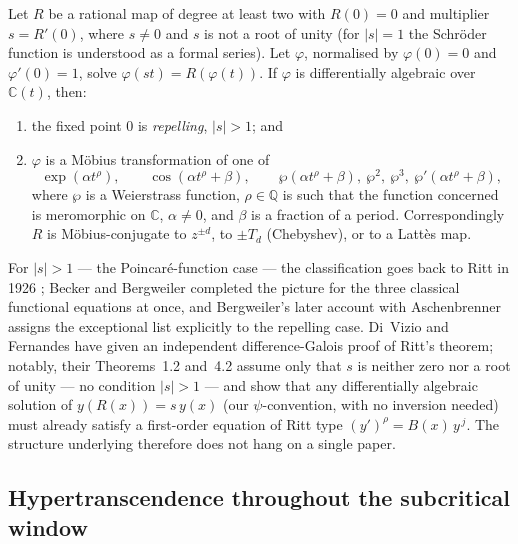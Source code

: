 \begin{theorem}
\label{a:thm:BB-main}
Let $R$ be a rational map of degree at least two with $R(0)=0$ and multiplier $s=R'(0)$, where $s\neq0$ and $s$ is not a root of unity (for $|s|=1$ the Schr\"oder function is understood as a formal series). Let $\varphi$, normalised by $\varphi(0)=0$ and $\varphi'(0)=1$, solve $\varphi(st)=R(\varphi(t))$. If $\varphi$ is differentially algebraic over $\mathbb{C}(t)$, then:
\begin{enumerate}[label=\textup{(\roman*)}]
\item the fixed point $0$ is \emph{repelling}, $|s|>1$; and
\item $\varphi$ is a M\"obius transformation of one of
\[
\exp(\alpha t^{\rho}),
\qquad
\cos(\alpha t^{\rho}+\beta),
\qquad
\wp(\alpha t^{\rho}+\beta),\ \wp^{2},\ \wp^{3},\ \wp'(\alpha t^{\rho}+\beta),
\]
where $\wp$ is a Weierstrass function, $\rho\in\mathbb{Q}$ is such that the function concerned is meromorphic on $\mathbb{C}$, $\alpha\neq0$, and $\beta$ is a fraction of a period. Correspondingly $R$ is M\"obius-conjugate to $z^{\pm d}$, to $\pm T_d$ (Chebyshev), or to a Latt\`es map.
\end{enumerate}
\end{theorem}

\begin{remark}
\label{a:rem:lineage}
For $|s|>1$ --- the Poincar\'e-function case --- the classification goes back to Ritt in 1926 \cite{Ritt1926}; Becker and Bergweiler completed the picture for the three classical functional equations at once, and Bergweiler's later account with Aschenbrenner \cite{AschenbrennerBergweiler2015} assigns the exceptional list explicitly to the repelling case. Di~Vizio and Fernandes \cite{DiVizioFernandes2021} have given an independent difference-Galois proof of Ritt's theorem; notably, their Theorems~1.2 and~4.2 assume only that $s$ is neither zero nor a root of unity --- no condition $|s|>1$ --- and show that any differentially algebraic solution of $y(R(x))=s\,y(x)$ (our $\psi$-convention, with no inversion needed) must already satisfy a first-order equation of Ritt type $(y')^{\rho}=B(x)\,y^{\,j}$. The structure underlying  therefore does not hang on a single paper.
\end{remark}

\subsection{Hypertranscendence throughout the subcritical window}

